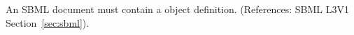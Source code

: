An SBML document must contain a \Model object definition.  (References:
SBML L3V1 Section~\ref{sec:sbml}).
